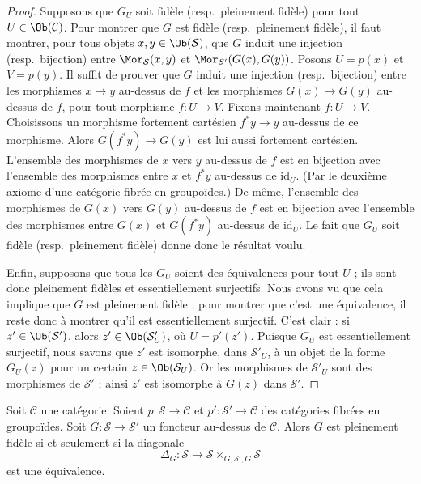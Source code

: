 \begin{proof}
\medskip\noindent
Supposons que $G_U$ soit fidèle (resp.\ pleinement fidèle)
pour tout $U\in\Ob(\mathcal C)$. Pour
montrer que $G$ est fidèle (resp.\ pleinement fidèle),
il faut montrer, pour tous objets
$x, y\in\Ob(\mathcal{S})$, que $G$ induit une
injection (resp.\ bijection) entre
$\Mor_\mathcal{S}(x, y)$ et
$\Mor_{\mathcal{S}'}(G(x), G(y))$.
Posons $U = p(x)$ et $V = p(y)$.
Il suffit de prouver que $G$
induit une injection (resp.\ bijection) entre les morphismes
$x \to y$ au-dessus de $f$ et les morphismes $G(x) \to G(y)$ au-dessus de $f$,
pour tout morphisme $f : U \to V$.
Fixons maintenant $f : U \to V$. Choisissons un morphisme fortement cartésien
$f^*y \to y$ au-dessus de ce morphisme. Alors $G(f^*y) \to G(y)$ est lui aussi
fortement cartésien.
L'ensemble des morphismes de $x$ vers $y$ au-dessus de $f$
est en bijection avec l'ensemble des morphismes entre
$x$ et $f^*y$ au-dessus de $\text{id}_U$. (Par le deuxième axiome
d'une catégorie fibrée en groupoïdes.) De même,
l'ensemble des morphismes de $G(x)$ vers $G(y)$ au-dessus de $f$
est en bijection avec l'ensemble des morphismes entre
$G(x)$ et $G(f^*y)$ au-dessus de $\text{id}_U$.
Le fait que $G_U$ soit fidèle (resp.\ pleinement fidèle)
donne donc le résultat voulu.

\medskip\noindent
Enfin, supposons que tous les $G_U$ soient des équivalences pour tout $U$ ; ils sont donc
pleinement fidèles et essentiellement surjectifs. Nous avons vu que cela implique que $G$ est
pleinement fidèle ; pour montrer que c'est une équivalence, il reste donc à montrer qu'il
est essentiellement surjectif. C'est clair : si $z'\in
\Ob(\mathcal{S}')$, alors $z'\in \Ob(\mathcal{S}'_U)$, où
$U = p'(z')$. Puisque $G_U$ est essentiellement surjectif, nous savons que
$z'$ est isomorphe, dans $\mathcal{S}'_U$, à un objet de la forme
$G_U(z)$ pour un certain $z\in \Ob(\mathcal{S}_U)$. Or les morphismes
de $\mathcal{S}'_U$ sont des morphismes de $\mathcal{S}'$ ; ainsi $z'$ est
isomorphe à $G(z)$ dans $\mathcal{S}'$.
\end{proof}

\begin{lemma}
\label{lemma-fully-faithful-diagonal-equivalence}
Soit $\mathcal{C}$ une catégorie. Soient $p : \mathcal{S}\to \mathcal{C}$ et
$p' : \mathcal{S'}\to \mathcal{C}$ des catégories fibrées en groupoïdes.
Soit $G : \mathcal{S}\to \mathcal {S}'$ un foncteur au-dessus de $\mathcal{C}$.
Alors $G$ est pleinement fidèle si et seulement si la diagonale
$$
\Delta_G :
\mathcal{S}
\longrightarrow
\mathcal{S} \times_{G, \mathcal{S}', G} \mathcal{S}
$$
est une équivalence.
\end{lemma}

